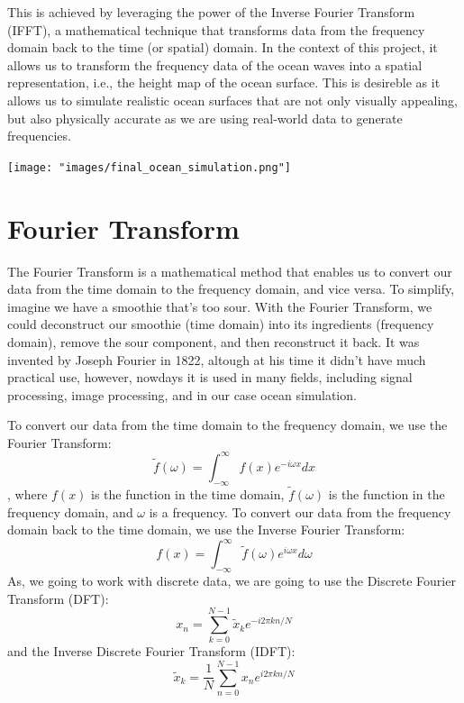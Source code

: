 This is achieved by leveraging the power of the Inverse Fourier Transform (IFFT), a mathematical technique that transforms data 
from the frequency domain back to the time (or spatial) domain. In the context of this project, 
it allows us to transform the frequency data of the ocean waves into a spatial representation, i.e., the height map of the ocean surface. This is
desireble as it allows us to simulate realistic ocean surfaces that are not only visually appealing, but also physically accurate as 
we are using real-world data to generate frequencies.

\begin{minipage}{1\textwidth}
    \centering
    \texttt{[image: "images/final\_ocean\_simulation.png"]}
    \label{fig:ocean_simulation}
\end{minipage}

\section{Fourier Transform}
The Fourier Transform is a mathematical method that enables us to convert our data from the time domain to the frequency domain, and vice versa. To simplify, imagine we have a smoothie that’s too sour. With the Fourier Transform, we could deconstruct our smoothie (time domain) into its ingredients (frequency domain), remove the sour component, and then reconstruct it back.
It was invented by Joseph Fourier\cite{fourier1822} in 1822, altough at his time it didn't have much practical use, however, nowdays it is used in many fields, including signal processing, image processing, and in our case ocean simulation.

To convert our data from the time domain to the frequency domain, we use the Fourier Transform:
\begin{equation}
\tilde{f}(\omega) = \int_{-\infty}^{\infty} f(x) e^{-i \omega x} dx
\end{equation}
, where $f(x)$ is the function in the time domain, $\tilde{f}(\omega)$ is the function in the frequency domain, and $\omega$ is a frequency.
To convert our data from the frequency domain back to the time domain, we use the Inverse Fourier Transform:
\begin{equation}
f(x) = \int_{-\infty}^{\infty} \tilde{f}(\omega) e^{i \omega x} d\omega
\end{equation}
As, we going to work with discrete data, we are going to use the Discrete Fourier Transform (DFT):
\begin{equation}
    x_n = \sum_{k=0}^{N-1} \tilde{x}_k e^{-i 2 \pi k n / N}
\end{equation}
and the Inverse Discrete Fourier Transform (IDFT):
\begin{equation}
    \tilde{x}_k = \frac{1}{N} \sum_{n=0}^{N-1} x_n e^{i 2 \pi k n / N}
    \label{eq:idft}
\end{equation}

